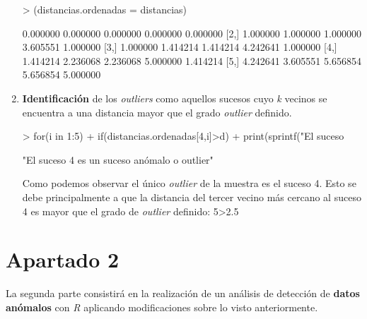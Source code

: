 \documentclass [a4paper] {article}
\begin{document}
\begin{enumerate}
\begin{Schunk}
\begin{Sinput}
> (distancias.ordenadas = distancias)
\end{Sinput}
\begin{Soutput}
         [,1]     [,2]     [,3]     [,4]     [,5]
[1,] 0.000000 0.000000 0.000000 0.000000 0.000000
[2,] 1.000000 1.000000 1.000000 3.605551 1.000000
[3,] 1.000000 1.414214 1.414214 4.242641 1.000000
[4,] 1.414214 2.236068 2.236068 5.000000 1.414214
[5,] 4.242641 3.605551 5.656854 5.656854 5.000000
\end{Soutput}
\end{Schunk}
	\item \textbf{Identificación} de los \textit{outliers} como aquellos sucesos cuyo \textit{k}
	      vecinos se encuentra a una distancia mayor que el grado \textit{outlier} definido.
\begin{Schunk}
\begin{Sinput}
> for(i in 1:5)
+ 	if(distancias.ordenadas[4,i]>d)
+ 		print(sprintf("El suceso %d es un suceso anómalo o outlier",i))
\end{Sinput}
\begin{Soutput}
[1] "El suceso 4 es un suceso anómalo o outlier"
\end{Soutput}
\end{Schunk}
Como podemos observar el único \textit{outlier} de la muestra es el suceso 4. Esto se debe principalmente
a que la distancia del tercer vecino más cercano al suceso 4 es mayor que el grado de \textit{outlier} definido:
5>2.5
\end{enumerate}

\newpage
\section{Apartado 2}
La segunda parte consistirá en la realización de un análisis de detección de \textbf{datos anómalos}
con \textit{R} aplicando modificaciones sobre lo visto anteriormente.
\end{document}
